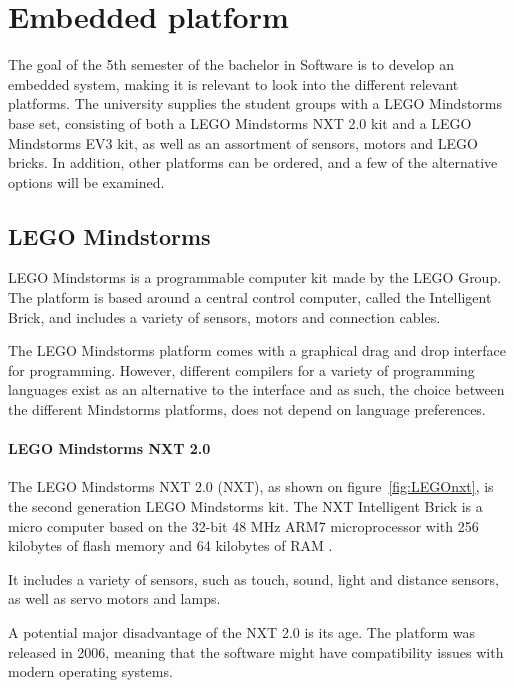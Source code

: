 

\section{Embedded platform}
The goal of the 5th semester of the bachelor in Software is to develop an embedded system, making it is relevant to look into the different relevant platforms.
The university supplies the student groups with a LEGO Mindstorms base set, consisting of both a LEGO Mindstorms NXT 2.0 kit and a LEGO Mindstorms EV3 kit, as well as an assortment of sensors, motors and LEGO bricks.
In addition, other platforms can be ordered, and a few of the alternative options will be examined.

\subsection{LEGO Mindstorms}
LEGO Mindstorms is a programmable computer kit made by the LEGO Group.
The platform is based around a central control computer, called the Intelligent Brick, and includes a variety of sensors, motors and connection cables.

The LEGO Mindstorms platform comes with a graphical drag and drop interface for programming.
However, different compilers for a variety of programming languages exist as an alternative to the interface and as such, the choice between the different Mindstorms platforms, does not depend on language preferences.

\paragraph{LEGO Mindstorms NXT 2.0}
The LEGO Mindstorms NXT 2.0 (NXT), as shown on figure~\autoref{fig:LEGOnxt}, is the second generation LEGO Mindstorms kit.%
The NXT Intelligent Brick is a micro computer based on the 32-bit 48 MHz ARM7 microprocessor with 256 kilobytes of flash memory and 64 kilobytes of RAM \cite{nxt2userguide} \cite{nxt2ev3compare}.

It includes a variety of sensors, such as touch, sound, light and distance sensors, as well as servo motors and lamps.

A potential major disadvantage of the NXT 2.0 is its age.
The platform was released in 2006, meaning that the software might have compatibility issues with modern operating systems.

